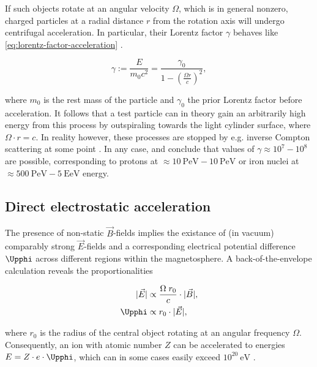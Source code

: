 If such objects rotate at an angular velocity $\Omega$, which is in general nonzero, charged particles at a radial distance $r$ from the rotation axis will undergo
centrifugal acceleration. In particular, their Lorentz factor $\gamma$ behaves like \autoref{eq:lorentz-factor-acceleration} \cite{rieger1999particle}.

\begin{equation}
\label{eq:lorentz-factor-acceleration}
\gamma := \frac{E}{m_0 c^2} = \frac{\gamma_0}{1 - \left(\frac{\Omega r}{c}\right)^2},
\end{equation}

where $m_0$ is the rest mass of the particle and $\gamma_0$ the prior Lorentz factor before acceleration. It follows that a test particle can in theory gain an
arbitrarily high energy from this process by outspiraling towards the light cylinder surface, where $\Omega\cdot r = c$. In reality however, these processes are
stopped by e.g. inverse Compton scattering at some point \cite{osmanov2007efficiency}. In any case, \cite{rieger1999particle} and \cite{osmanov2007efficiency}
conclude that values of $\gamma \approx 10^7-10^8$ are possible, corresponding to protons at $\approx\SI{10}{\peta\electronvolt}-\SI{10}{\peta\electronvolt}$ or 
iron nuclei at $\approx\SI{500}{\peta\electronvolt}-\SI{5}{\exa\electronvolt}$ energy.

\subsection{Direct electrostatic acceleration}
\label{ssec:cr-electrostatic-acceleration}

The presence of non-static $\vec{B}$-fields implies the existance of (in vacuum) comparably strong $\vec{E}$-fields and a corresponding electrical potential 
difference $\Upphi$ across different regions within the magnetosphere. A back-of-the-envelope calculation reveals the proportionalities

\begin{align}
|\vec{E}| &\propto \frac{\Omega\;r_0}{c} \cdot |\vec{B}|, \\
\Upphi &\propto r_0 \cdot |\vec{E}|,
\end{align}

where $r_0$ is the radius of the central object rotating at an angular frequency $\Omega$. Consequently, an ion with atomic number $Z$ can be accelerated to 
energies $E = Z \cdot e \cdot \Upphi$, which can in some cases easily exceed $10^{20}\SI{}{\electronvolt}$ \cite{rieger2009cosmic}. 

